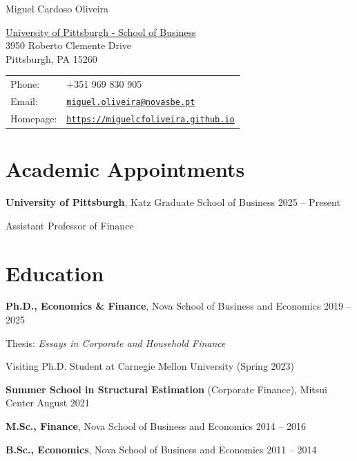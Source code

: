 \documentclass[letterpaper]{article}
\def\name{Miguel Cardoso Oliveira}
\newenvironment{itemize*}{
  \begin{list}{}{
    \setlength{\leftmargin}{1.5em}
  }
}{
  \end{list}
}
\begin{document}
\begin{center}
{\huge \name}
\end{center}

\vspace{0.1in}

\begin{minipage}{0.45\linewidth}
  \href{https://www.cba.pitt.edu}{University of Pittsburgh - School of Business} \\
  3950 Roberto Clemente Drive \\ 
  Pittsburgh, PA 15260 
\end{minipage}
\begin{minipage}{0.45\linewidth}
  \begin{tabular}{ll}
    Phone: & +351 969 830 905 \\
    Email: & \href{mailto:miguel.oliveira@novasbe.pt}{\tt miguel.oliveira@novasbe.pt} \\
    Homepage: & \href{https://miguelcfoliveira.github.io}{\tt https://miguelcfoliveira.github.io} 
  \end{tabular}
\end{minipage}

\section*{Academic Appointments}
\vspace{-0.2in}
\hrulefill
\begin{itemize*}
\item \textbf{University of Pittsburgh}, Katz Graduate School of Business \hfill 2025 -- Present
\vspace{-3pt}
\item \phantom{aaa} Assistant Professor of Finance
\end{itemize*}

\section*{Education}
\vspace{-0.2in}
\hrulefill
\begin{itemize*}
\item \textbf{Ph.D., Economics \& Finance}, Nova School of Business and Economics \hfill 2019 -- 2025
\vspace{-3pt}
\item \phantom{aaa} Thesis: \textit{Essays in Corporate and Household Finance}
\item \phantom{aaa} Visiting Ph.D. Student at Carnegie Mellon University (Spring 2023)
\item \textbf{Summer School in Structural Estimation} (Corporate Finance), Mitsui Center \hfill August 2021
\item \textbf{M.Sc., Finance}, Nova School of Business and Economics \hfill 2014 -- 2016
\item \textbf{B.Sc., Economics}, Nova School of Business and Economics \hfill  2011 -- 2014
\end{itemize*}
\end{document}
